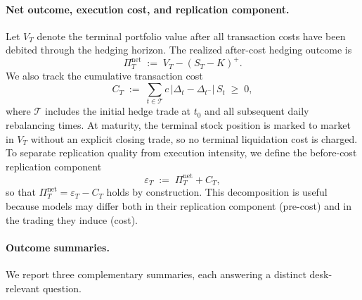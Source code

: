 \paragraph{Net outcome, execution cost, and replication component.}
Let $V_T$ denote the terminal portfolio value after all transaction costs have been debited through the hedging horizon.
The realized after-cost hedging outcome is
\begin{equation}
\Pi_T^{\mathrm{net}} \;:=\; V_T - (S_T-K)^+ .
\label{eq:pi_net_def}
\end{equation}
We also track the cumulative transaction cost
\begin{equation}
C_T \;:=\; \sum_{t\in\mathcal{T}} c\,|\Delta_t-\Delta_{t^-}|\,S_t \;\ge\; 0 ,
\label{eq:ct_def}
\end{equation}
where $\mathcal{T}$ includes the initial hedge trade at $t_0$ and all subsequent daily rebalancing times.
At maturity, the terminal stock position is marked to market in $V_T$ without an explicit closing trade, so no terminal liquidation cost is charged.
To separate replication quality from execution intensity, we define the before-cost replication component
\begin{equation}
\varepsilon_T \;:=\; \Pi_T^{\mathrm{net}} + C_T ,
\label{eq:eps_def}
\end{equation}
so that $\Pi_T^{\mathrm{net}}=\varepsilon_T-C_T$ holds by construction.
This decomposition is useful because models may differ both in their replication component (pre-cost) and in the trading they induce (cost).

\paragraph{Outcome summaries.}
We report three complementary summaries, each answering a distinct desk-relevant question.

